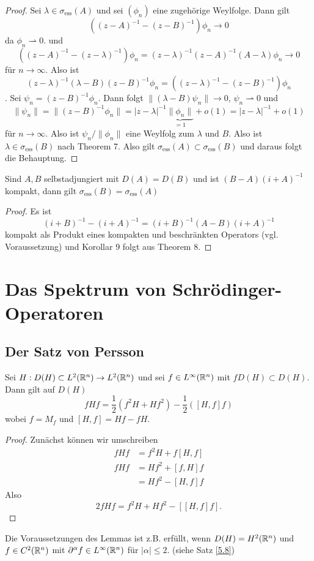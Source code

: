 \documentclass{mycourse}
\begin{document}
\begin{proof}
Sei $\lambda\in \sigma_{\text{ess}} (A)$ und sei $(\phi_n)$ eine zugehörige Weylfolge. Dann gilt
\[
((z-A)^{-1} - (z-B)^{-1})\phi_n \to 0
\]
da $\phi_n \rightharpoonup 0$. und
\[
((z-A)^{-1} - (z-\lambda)^{-1}) \phi_n = (z-\lambda)^{-1} (z-A)^{-1} (A- \lambda) \phi_n \to 0
\]
für $n\to \infty$. Also ist
\[
 (z-\lambda)^{-1} (\lambda- B) (z-B)^{-1} \phi_n = ((z-\lambda)^{-1} - (z-B)^{-1}) \phi_n 
\]
. Sei $\psi_n = (z-B)^{-1} \phi_n$. Dann folgt $\|(\lambda-B)\psi_n\| \to 0$, $\psi_n \rightharpoonup 0$ und
\[
\| \psi_n\| = \| (z- B)^{-1} \phi_n\| = |z-\lambda|^{-1} \underbrace{\| \phi_n \|}_{=1} + o(1)= |z-\lambda|^{-1} +o(1)
\]
für $n\to \infty$. Also ist $\psi_n/\|\phi_n\|$ eine Weylfolg zum $\lambda$ und $B$. Also ist $\lambda \in \sigma_{\text{ess}} (B)$ nach Theorem 7. Also gilt $\sigma_{\text{ess}}(A) \subset \sigma_{\text{ess}}(B)$ und daraus folgt die Behauptung.
\end{proof}

\begin{kor}
Sind $A,B$ selbstadjungiert mit $D(A) = D(B)$ und ist $(B-A) (i+A)^{-1}$ kompakt, dann gilt $\sigma_{\text{ess}}(B) = \sigma_{\text{ess}}(A)$
\end{kor}
\begin{proof}
Es ist
\[
(i+B)^{-1} - (i+A)^{-1} = (i+B)^{-1} (A-B) (i+A)^{-1}
\]
kompakt als Produkt eines kompakten und beschränkten Operators (vgl. Voraussetzung) und Korollar 9 folgt aus Theorem 8. 
\end{proof}

\chapter{Das Spektrum von Schrödinger-Operatoren}
\section{Der Satz von Persson}

\begin{lem}\label{7.1}
Sei $H:D(H) \subset L^2(\mathbb{R}^n) \to L^2(\mathbb{R}^n)$ und sei $f\in L^\infty(\mathbb{R}^n)$ mit $fD(H)\subset D(H)$. Dann gilt auf $D(H)$
\[
fHf= \frac{1}{2} (f^2H +Hf^2) - \frac{1}{2} ([H,f]f)
\]
wobei $f= M_f$ und $[H,f] = Hf-fH$. 
\end{lem}
\begin{proof}
Zunächst können wir umschreiben \fixme
\begin{align*}
fHf &= f^2 H + f[H,f] \\
fHf &= Hf^2 + [f,H] f \\
&= Hf^2 - [H,f]f
\end{align*}
Also
\[
2 fHf = f^2 H + Hf^2 - [ [H,f]f].
\]
\end{proof}
Die Voraussetzungen des Lemmas ist z.B. erfüllt, wenn $D(H)=H^2(\mathbb{R}^n)$ und $f\in C^2(\mathbb{R}^n)$ mit $\partial^\alpha f \in L^\infty(\mathbb{R}^n)$ für $|\alpha|\le 2$. (siehe Satz \ref{5.8})
\end{document}
